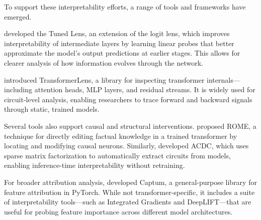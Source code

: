 To support these interpretability efforts, a range of tools and frameworks have emerged.

\citet{belrose2023eliciting} developed the Tuned Lens, an extension of the logit lens, which improves interpretability of intermediate layers by learning linear probes that better approximate the model's output predictions at earlier stages. This allows for clearer analysis of how information evolves through the network.

\citet{nanda2022transformerlens} introduced TransformerLens, a library for inspecting transformer internals—including attention heads, MLP layers, and residual streams. It is widely used for circuit-level analysis, enabling researchers to trace forward and backward signals through static, trained models.

Several tools also support causal and structural interventions. \citet{meng2022locating} proposed ROME, a technique for directly editing factual knowledge in a trained transformer by locating and modifying causal neurons. Similarly, \citet{conmy2023towards} developed ACDC, which uses sparse matrix factorization to automatically extract circuits from models, enabling inference-time interpretability without retraining.

For broader attribution analysis, \citet{kokhlikyan2020captum} developed Captum, a general-purpose library for feature attribution in PyTorch. While not transformer-specific, it includes a suite of interpretability tools—such as Integrated Gradients and DeepLIFT—that are useful for probing feature importance across different model architectures.



